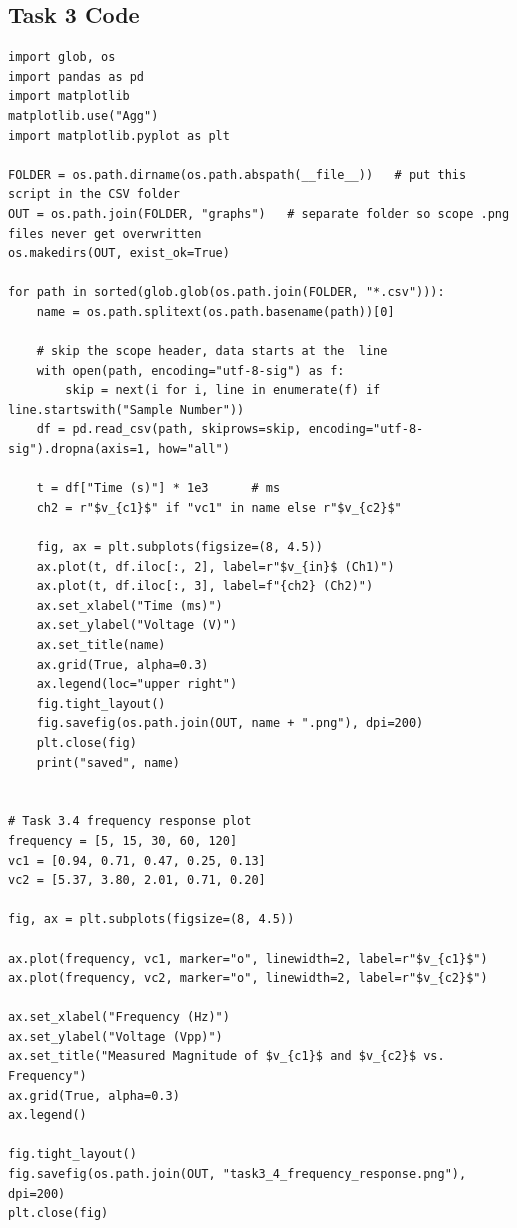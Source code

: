 \documentclass[12pt]{article}
\begin{document}
\subsection*{Task 3 Code}
\begin{lstlisting}[style=python, caption={Graphing raw CSVs and Table data for}]
import glob, os
import pandas as pd
import matplotlib
matplotlib.use("Agg")
import matplotlib.pyplot as plt

FOLDER = os.path.dirname(os.path.abspath(__file__))   # put this script in the CSV folder
OUT = os.path.join(FOLDER, "graphs")   # separate folder so scope .png files never get overwritten
os.makedirs(OUT, exist_ok=True)

for path in sorted(glob.glob(os.path.join(FOLDER, "*.csv"))):
    name = os.path.splitext(os.path.basename(path))[0]

    # skip the scope header, data starts at the  line
    with open(path, encoding="utf-8-sig") as f:
        skip = next(i for i, line in enumerate(f) if line.startswith("Sample Number"))
    df = pd.read_csv(path, skiprows=skip, encoding="utf-8-sig").dropna(axis=1, how="all")

    t = df["Time (s)"] * 1e3      # ms
    ch2 = r"$v_{c1}$" if "vc1" in name else r"$v_{c2}$"

    fig, ax = plt.subplots(figsize=(8, 4.5))
    ax.plot(t, df.iloc[:, 2], label=r"$v_{in}$ (Ch1)")
    ax.plot(t, df.iloc[:, 3], label=f"{ch2} (Ch2)")
    ax.set_xlabel("Time (ms)")
    ax.set_ylabel("Voltage (V)")
    ax.set_title(name)
    ax.grid(True, alpha=0.3)
    ax.legend(loc="upper right")
    fig.tight_layout()
    fig.savefig(os.path.join(OUT, name + ".png"), dpi=200)
    plt.close(fig)
    print("saved", name)


# Task 3.4 frequency response plot
frequency = [5, 15, 30, 60, 120]
vc1 = [0.94, 0.71, 0.47, 0.25, 0.13]
vc2 = [5.37, 3.80, 2.01, 0.71, 0.20]

fig, ax = plt.subplots(figsize=(8, 4.5))

ax.plot(frequency, vc1, marker="o", linewidth=2, label=r"$v_{c1}$")
ax.plot(frequency, vc2, marker="o", linewidth=2, label=r"$v_{c2}$")

ax.set_xlabel("Frequency (Hz)")
ax.set_ylabel("Voltage (Vpp)")
ax.set_title("Measured Magnitude of $v_{c1}$ and $v_{c2}$ vs. Frequency")
ax.grid(True, alpha=0.3)
ax.legend()

fig.tight_layout()
fig.savefig(os.path.join(OUT, "task3_4_frequency_response.png"), dpi=200)
plt.close(fig)



\end{lstlisting}
\end{document}
